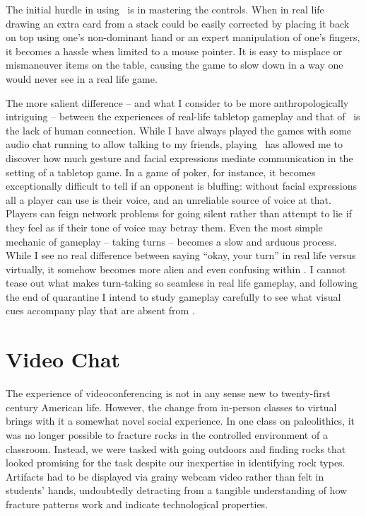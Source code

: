 \documentclass[2020/08/28 v2]{../../../coursework}
\newcommand{\tbl}{\citetitle{Tabletop}}
\begin{document}
The initial hurdle in using \tbl\ is in mastering the controls. When in real life drawing
an extra card from a stack could be easily corrected by placing it back on top using one's
non-dominant hand or an expert manipulation of one's fingers, it becomes a hassle when
limited to a mouse pointer. It is easy to misplace or mismaneuver items on the table,
causing the game to slow down in a way one would never see in a real life game.

The more salient difference -- and what I consider to be more anthropologically
intriguing -- between the experiences of real-life tabletop gameplay and that of
\tbl\ is the lack of human connection. While I have always played the games with
some audio chat running to allow talking to my friends, playing \tbl\ has
allowed me to discover how much gesture and facial expressions mediate communication
in the setting of a tabletop game. In a game of poker, for instance, it becomes exceptionally
difficult to tell if an opponent is bluffing: without facial expressions all a player can
use is their voice, and an unreliable source of voice at that. Players can feign network
problems for going silent rather than attempt to lie if they feel as if their tone
of voice may betray them. Even the most simple mechanic of gameplay -- taking turns -- becomes
a slow and arduous process. While I see no real difference between saying \enquote{okay,
your turn} in real life versus virtually, it somehow becomes more alien and even
confusing within \tbl. I cannot tease out what makes turn-taking so seamless in real
life gameplay, and following the end of quarantine I intend to study gameplay carefully
to see what visual cues accompany play that are absent from \tbl.

\section{Video Chat}

The experience of videoconferencing is not in any sense new to twenty-first century
American life. However, the change from in-person classes to virtual brings with
it a somewhat novel social experience. In one class on paleolithics, it was no
longer possible to fracture rocks in the controlled environment of a classroom.
Instead, we were tasked with going outdoors and finding rocks that looked promising
for the task despite our inexpertise in identifying rock types.
Artifacts had to be displayed via grainy webcam video rather than felt in students'
hands, undoubtedly detracting from a tangible understanding of how fracture
patterns work and indicate technological properties.
\end{document}
